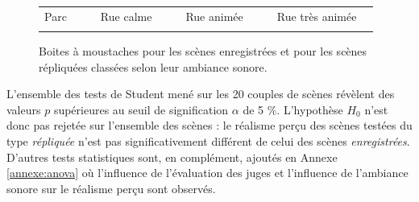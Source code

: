 \begin{figure}[ht]
\centering
{}

\begin{tabular}{|p{1.5cm}|l|p{0.001cm}|p{2cm}|l|p{0.001cm}|p{2cm}|l|p{0.001cm}|p{2.75cm}|l|}
\hhline{|-|-|~|-|-|~|-|-|~|-|-|}
Parc & {\cellcolor[HTML]{5AB25A}} & & Rue calme & {\cellcolor[HTML]{FFCB2F}} & & Rue animée & {\cellcolor[HTML]{F56B00}} & &  Rue très animée & {\cellcolor[HTML]{9A0000}}\\
\hhline{|-|-|~|-|-|~|-|-|~|-|-|}
\end{tabular}

\caption{Boites à moustaches pour les scènes enregistrées   et pour les scènes répliquées  classées selon leur ambiance sonore.}

\label{fig:boxplot_scene}
\end{figure}

L'ensemble des tests de Student mené sur les 20 couples de scènes révèlent des valeurs $p$ supérieures au seuil de signification $\alpha$ de 5 $\%$. L'hypothèse $H_0$ n'est donc pas rejetée sur l'ensemble des scènes : le réalisme perçu des scènes testées du type \textit{répliquée} n'est pas significativement différent de celui des scènes \textit{enregistrées}. D'autres tests statistiques sont, en complément, ajoutés en Annexe \ref{annexe:anova} où l'influence de l'évaluation des juges et l'influence de l'ambiance sonore sur le réalisme perçu sont observés.

